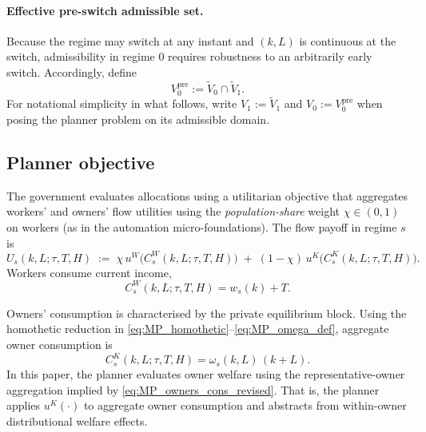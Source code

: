 \documentclass{article}
\begin{document}
\paragraph{Effective pre-switch admissible set.}
Because the regime may switch at any instant and $(k,L)$ is continuous at the switch, admissibility in regime $0$ requires
robustness to an arbitrarily early switch. Accordingly, define
\[
V_0^{\mathrm{pre}}:=\widetilde V_0\cap \widetilde V_1.
\tag{38}
\]
For notational simplicity in what follows, write $V_1:=\widetilde V_1$ and $V_0:=V_0^{\mathrm{pre}}$ when posing the planner
problem on its admissible domain.



\subsection{Planner objective}\label{subsec:planner_objective}

The government evaluates allocations using a utilitarian objective that aggregates workers'
and owners' flow utilities using the \emph{population-share} weight $\chi\in(0,1)$ on workers
(as in the automation micro-foundations). The flow payoff in regime $s$ is
\begin{equation}
U_s(k,L;\tau,T,H)
\;:=\;
\chi\,u^W\!\big(C^W_s(k,L;\tau,T,H)\big)
\;+\;
(1-\chi)\,u^K\!\big(C^K_s(k,L;\tau,T,H)\big).
\label{eq:MP_planner_flow_payoff_revised}
\end{equation}
Workers consume current income,
\begin{equation}
C^W_s(k,L;\tau,T,H)=w_s(k)+T.
\label{eq:MP_workers_cons_revised}
\end{equation}

Owners' consumption is characterised by the private equilibrium block. Using the homothetic
reduction in \eqref{eq:MP_homothetic}--\eqref{eq:MP_omega_def}, aggregate owner consumption is
\begin{equation}
C^K_s(k,L;\tau,T,H)=\omega_s(k,L)\,(k+L).
\label{eq:MP_owners_cons_revised}
\end{equation}
In this paper, the planner evaluates owner welfare using the representative-owner aggregation
implied by \eqref{eq:MP_owners_cons_revised}. That is, the planner applies $u^K(\cdot)$ to
aggregate owner consumption and abstracts from within-owner distributional welfare effects.
\end{document}
